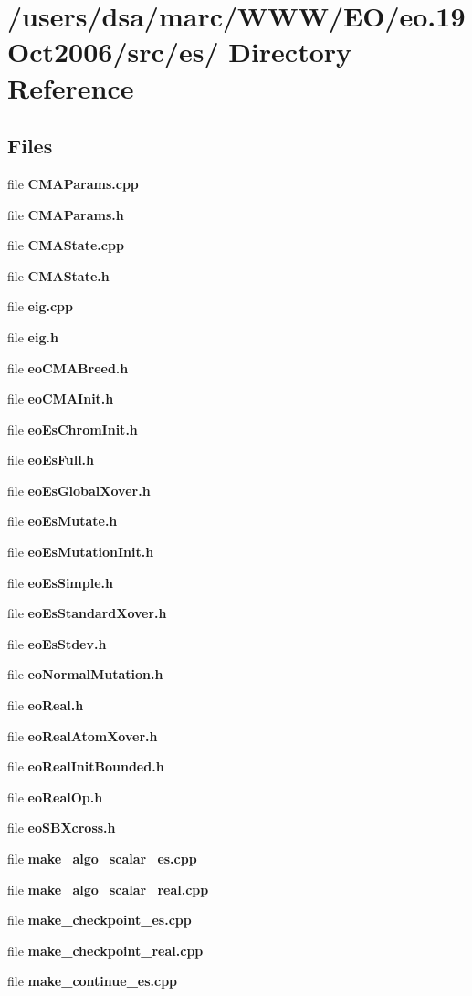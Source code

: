 \section{/users/dsa/marc/WWW/EO/eo.19Oct2006/src/es/ Directory Reference}
\label{dir_000010}
\subsection*{Files}
\begin{CompactItemize}
\item 
file {\bf CMAParams.cpp}
\item 
file {\bf CMAParams.h}
\item 
file {\bf CMAState.cpp}
\item 
file {\bf CMAState.h}
\item 
file {\bf eig.cpp}
\item 
file {\bf eig.h}
\item 
file {\bf eoCMABreed.h}
\item 
file {\bf eoCMAInit.h}
\item 
file {\bf eoEsChromInit.h}
\item 
file {\bf eoEsFull.h}
\item 
file {\bf eoEsGlobalXover.h}
\item 
file {\bf eoEsMutate.h}
\item 
file {\bf eoEsMutationInit.h}
\item 
file {\bf eoEsSimple.h}
\item 
file {\bf eoEsStandardXover.h}
\item 
file {\bf eoEsStdev.h}
\item 
file {\bf eoNormalMutation.h}
\item 
file {\bf eoReal.h}
\item 
file {\bf eoRealAtomXover.h}
\item 
file {\bf eoRealInitBounded.h}
\item 
file {\bf eoRealOp.h}
\item 
file {\bf eoSBXcross.h}
\item 
file {\bf make_algo_scalar_es.cpp}
\item 
file {\bf make_algo_scalar_real.cpp}
\item 
file {\bf make_checkpoint_es.cpp}
\item 
file {\bf make_checkpoint_real.cpp}
\item 
file {\bf make_continue_es.cpp}

\end{CompactItemize}
